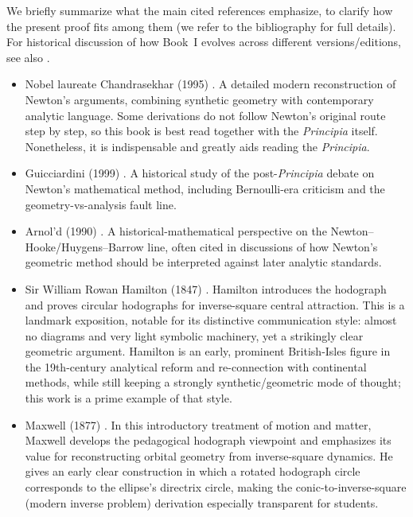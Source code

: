 We briefly summarize what the main cited references emphasize, to clarify how the present proof fits among them (we refer to the bibliography for full details). For historical discussion of how Book~I evolves across different versions/editions, see also \cite{Nov95,chandrasekhar1995principia}.
\begin{itemize}

  \item Nobel laureate Chandrasekhar (1995) \cite{chandrasekhar1995principia}. A detailed modern reconstruction of Newton's arguments, combining synthetic geometry with contemporary analytic language. Some derivations do not follow Newton's original route step by step, so this book is best read together with the \emph{Principia} itself. Nonetheless, it is indispensable and greatly aids reading the \emph{Principia}.

  \item Guicciardini (1999) \cite{guicciardini1999reading}. A historical study of the post-\emph{Principia} debate on Newton's mathematical method, including Bernoulli-era criticism and the geometry-vs-analysis fault line.

  \item Arnol'd (1990) \cite{arnold1990huygens}. A historical-mathematical perspective on the Newton--Hooke/Huygens--Barrow line, often cited in discussions of how Newton's geometric method should be interpreted against later analytic standards.

  \item Sir William Rowan Hamilton (1847) \cite{hamilton1847hodograph}. Hamilton introduces the hodograph and proves circular hodographs for inverse-square central attraction. This is a landmark exposition, notable for its distinctive communication style: almost no diagrams and very light symbolic machinery, yet a strikingly clear geometric argument. Hamilton is an early, prominent British-Isles figure in the 19th-century analytical reform and re-connection with continental methods, while still keeping a strongly synthetic/geometric mode of thought; this work is a prime example of that style.

  \item Maxwell (1877) \cite{maxwell1877mattermotion}. In this introductory treatment of motion and matter, Maxwell develops the pedagogical hodograph viewpoint and emphasizes its value for reconstructing orbital geometry from inverse-square dynamics. He gives an early clear construction in which a rotated hodograph circle corresponds to the ellipse's directrix circle, making the conic-to-inverse-square (modern inverse problem) derivation especially transparent for students.


\end{itemize}
